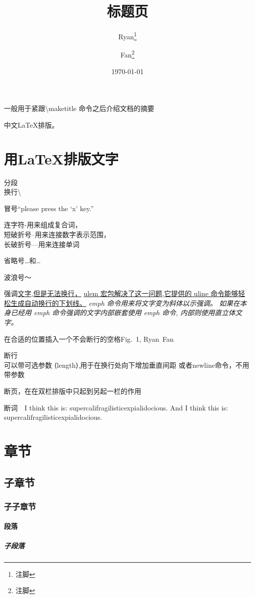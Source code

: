 \documentclass[a4paper]{ctexart}
\begin{document}
\title{标题页}
\author{Ryan\thanks{注脚}%
    \and Fan\thanks{注脚}%
    }
\date{\today}
\maketitle
\abstract
一般用于紧跟\textbackslash maketitle 命令之后介绍文档的摘要\par
中文\LaTeX{}排版。
\section{用\LaTeX 排版文字}
{}分段\\换行\textbackslash\par
冒号``please press the `x' key.''\par
连字符-用来组成复合词，\\%
短破折号--用来连接数字表示范围，\\%
长破折号---用来连接单词\par
省略号\dots{}和\ldots\par
波浪号～\par
强调\underline{文字,但是无法换行，}%
\uline{ulem 宏包解决了这一问题,它提供的 uline 命令能够轻松生成自动换行的下划线。}%
\emph{emph 命令用来将文字变为斜体以示强调。%
    \emph{如果在本身已经用 emph 命令强调的文字内部嵌套使用 emph 命令,}%
    内部则使用直立体文字。%
    }\par
在合适的位置插入一个不会断行的空格Fig.~1, Ryan~Fan\par
断行\\[15pt]可以带可选参数 ⟨length⟩,用于在换行处向下增加垂直间距%
\newline{}或者newline命令，不用带参数\par
\newpage 断页，在在双栏排版中只起到另起一栏的作用\par
断词　I think this is: supercalifragil\-isticexpialidocious. %
And I think this is: supercalifragilisticexpialidocious.\par
\newpage
\tableofcontents
\section[目录和页眉页脚]{章节}
\subsection{子章节}
\subsubsection{子子章节}
\paragraph{段落}
\subparagraph{子段落}
\end{document}
